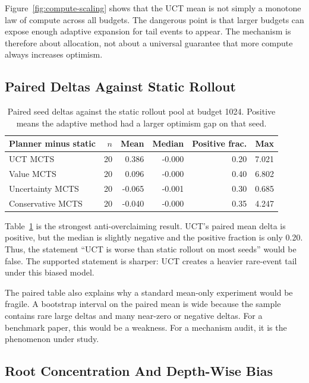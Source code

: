 \documentclass{article}
\begin{document}
Figure~\ref{fig:compute-scaling} shows that the UCT mean is not simply a monotone law of compute across all budgets. The dangerous point is that larger budgets can expose enough adaptive expansion for tail events to appear. The mechanism is therefore about allocation, not about a universal guarantee that more compute always increases optimism.

\subsection{Paired Deltas Against Static Rollout}

\begin{table}[t]
\caption{Paired seed deltas against the static rollout pool at budget 1024. Positive means the adaptive method had a larger optimism gap on that seed.}
\label{tab:paired1024}
\begin{center}
\begin{tabular}{lrrrrr}
\toprule
Planner minus static & \(n\) & Mean & Median & Positive frac. & Max \\
\midrule
UCT MCTS & 20 & 0.386 & -0.000 & 0.20 & 7.021 \\
Value MCTS & 20 & 0.096 & -0.000 & 0.40 & 6.802 \\
Uncertainty MCTS & 20 & -0.065 & -0.001 & 0.30 & 0.685 \\
Conservative MCTS & 20 & -0.040 & -0.000 & 0.35 & 4.247 \\
\bottomrule
\end{tabular}
\end{center}
\end{table}

Table~\ref{tab:paired1024} is the strongest anti-overclaiming result. UCT's paired mean delta is positive, but the median is slightly negative and the positive fraction is only 0.20. Thus, the statement ``UCT is worse than static rollout on most seeds'' would be false. The supported statement is sharper: UCT creates a heavier rare-event tail under this biased model.

The paired table also explains why a standard mean-only experiment would be fragile. A bootstrap interval on the paired mean is wide because the sample contains rare large deltas and many near-zero or negative deltas. For a benchmark paper, this would be a weakness. For a mechanism audit, it is the phenomenon under study.

\subsection{Root Concentration And Depth-Wise Bias}
\end{document}
